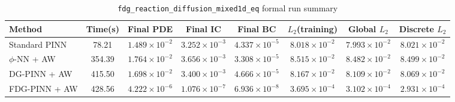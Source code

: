 \begin{table}[h]
\centering
\caption{\texttt{fdg\_reaction\_diffusion\_mixed1d\_eq} formal run summary}
\begin{adjustbox}{max width=\textwidth}
\scriptsize
\begin{tabular}{lccccccc}
\toprule
Method & Time(s) & Final PDE & Final IC & Final BC & $L_2$(training) & Global $L_2$ & Discrete $L_2$ \\
\midrule
Standard PINN & 78.21 & $1.489\times10^{-2}$ & $3.252\times10^{-3}$ & $4.337\times10^{-5}$ & $8.018\times10^{-2}$ & $7.993\times10^{-2}$ & $8.021\times10^{-2}$ \\
$\phi$-NN + AW & 354.39 & $1.764\times10^{-2}$ & $3.656\times10^{-3}$ & $3.308\times10^{-5}$ & $8.515\times10^{-2}$ & $8.482\times10^{-2}$ & $8.499\times10^{-2}$ \\
DG-PINN + AW & 415.50 & $1.698\times10^{-2}$ & $3.400\times10^{-3}$ & $4.666\times10^{-5}$ & $8.167\times10^{-2}$ & $8.109\times10^{-2}$ & $8.069\times10^{-2}$ \\
FDG-PINN + AW & 428.56 & $4.222\times10^{-6}$ & $1.076\times10^{-7}$ & $6.936\times10^{-8}$ & $3.695\times10^{-4}$ & $3.102\times10^{-4}$ & $2.931\times10^{-4}$ \\
\bottomrule
\end{tabular}
\end{adjustbox}
\end{table}
